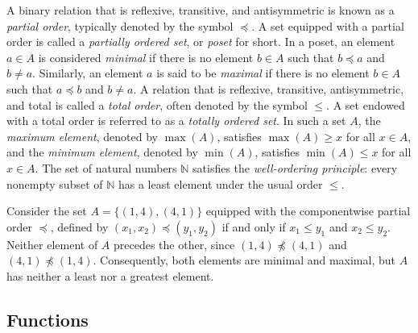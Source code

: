 A binary relation that is reflexive, transitive, and antisymmetric is known as a \emph{partial order}, typically denoted by the symbol $\preceq$. A set equipped with a partial order is called a \emph{partially ordered set}, or \emph{poset} for short. In a poset, an element $a \in A$ is considered \emph{minimal} if there is no element $b \in A$ such that $b \preceq a$ and $b \neq a$. Similarly, an element $a$ is said to be \emph{maximal} if there is no element $b \in A$ such that $a \preceq b$ and $b \neq a$. A relation that is reflexive, transitive, antisymmetric, and total is called a \emph{total order}, often denoted by the symbol $\leq$. A set endowed with a total order is referred to as a \emph{totally ordered set}. In such a set $A$, the \emph{maximum element}, denoted by $\max(A)$, satisfies $\max(A) \geq x$ for all $x \in A$, and the \emph{minimum element}, denoted by $\min(A)$, satisfies $\min(A) \leq x$ for all $x \in A$. The set of natural numbers $\mathbb{N}$ satisfies
the \emph{well-ordering principle}: every nonempty subset of $\mathbb{N}$ has a least element under the usual order $\leq$.

\begin{example}
Consider the set $A = \{(1,4), (4,1)\}$ equipped with the componentwise partial order $\preceq$, defined by $(x_1,x_2) \preceq (y_1,y_2)$ if and only if $x_1 \leq y_1$ and $x_2 \leq y_2$. Neither element of $A$ precedes the other, since $(1,4) \npreceq (4,1)$ and $(4,1) \npreceq (1,4)$. Consequently, both elements are minimal and maximal, but $A$ has neither a least nor a greatest element.
\end{example}


\subsection*{Functions}

